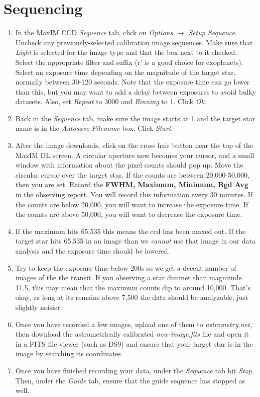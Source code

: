 \documentclass[11pt]{report}
\begin{document}
\section{Sequencing}

\begin{enumerate}
\item In the MaxIM CCD \emph{Sequence} tab, click on \emph{Options} {$\rightarrow$} \emph{Setup Sequence}. Uncheck any previously-selected calibration image sequences. Make sure that \emph{Light} is selected for the image type and that the box next to it checked. Select the appropriate filter and suffix (r' is a good choice for exoplanets). Select an exposure time depending on the magnitude of the target star, normally between 30-120 seconds. Note that the exposure time can go lower than this, but you may want to add a delay between exposures to avoid bulky datasets. Also, set \emph{Repeat} to 3000 and \emph{Binning} to 1. Click \emph{Ok}.
\item Back in the \emph{Sequence} tab, make sure the image starts at 1 and the target star name is in the \emph{Autosave Filename} box. Click \emph{Start}.
\item After the image downloads, click on the cross hair button near the top of the MaxIM DL screen. A circular aperture now becomes your cursor, and a small window with information about the pixel counts should pop up. Move the circular cursor over the target star. If the counts are between 20,000-50,000, then you are set. Record the {\bf FWHM, Maximum, Minimum, Bgd Avg} in the observing report. You will record this information every 30 minutes. If the counts are below 20,000, you will want to increase the exposure time. If the counts are above 50,000, you will want to decrease the exposure time. 
\item If the maximum hits 65,535 this means the ccd has been maxed out. If the target star hits 65,535 in an image than we \emph{cannot} use that image in our data analysis and the exposure time should be lowered.
\item Try to keep the exposure time below 200s so we get a decent number of images of the the transit. If you observing a star dimmer than magnitude 11.5, this may mean that the maximum counts dip to around 10,000. That's okay, as long at its remains above 7,500 the data should be analyzable, just slightly noisier.
\item Once you have recorded a few images, upload one of them to \emph{astrometry.net}, then download the astrometrically calibrated \emph{new-image.fits} file and open it in a FITS file viewer (such as DS9) and ensure that your target star is in the image by searching its coordinates.
\item Once you have finished recording your data, under the \emph{Sequence} tab hit \emph{Stop}. Then, under the \emph{Guide} tab, ensure that the guide sequence has stopped as well.
\end{enumerate}
\end{document}
